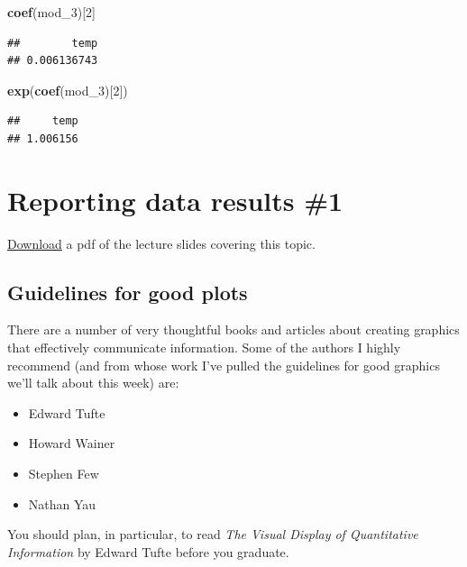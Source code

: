 \documentclass[]{book}
\makeatletter
\newenvironment{Shaded}{\begin{snugshade}}{\end{snugshade}}
\newcommand{\KeywordTok}[1]{\textcolor[rgb]{0.13,0.29,0.53}{\textbf{#1}}}
\newcommand{\DecValTok}[1]{\textcolor[rgb]{0.00,0.00,0.81}{#1}}
\newcommand{\NormalTok}[1]{#1}
\providecommand{\tightlist}{%
  \setlength{\itemsep}{0pt}\setlength{\parskip}{0pt}}
\newenvironment{kframe}{%
\medskip{}
\setlength{\fboxsep}{.8em}
 \def\at@end@of@kframe{}%
 \ifinner\ifhmode%
  \def\at@end@of@kframe{\end{minipage}}%
  \begin{minipage}{\columnwidth}%
 \fi\fi%
 \def\FrameCommand##1{\hskip\@totalleftmargin \hskip-\fboxsep
 \colorbox{shadecolor}{##1}\hskip-\fboxsep
     \hskip-\linewidth \hskip-\@totalleftmargin \hskip\columnwidth}%
 \MakeFramed {\advance\hsize-\width
   \@totalleftmargin\z@ \linewidth\hsize
   \@setminipage}}%
 {\par\unskip\endMakeFramed%
 \at@end@of@kframe}
\renewenvironment{Shaded}{\begin{kframe}}{\end{kframe}}
\theoremstyle{definition}
\theoremstyle{definition}
\theoremstyle{definition}
\theoremstyle{remark}
\makeatother
\begin{document}
\begin{Shaded}
\begin{Highlighting}[]
\KeywordTok{coef}\NormalTok{(mod_}\DecValTok{3}\NormalTok{)[}\DecValTok{2}\NormalTok{]}
\end{Highlighting}
\end{Shaded}

\begin{verbatim}
##        temp 
## 0.006136743
\end{verbatim}

\begin{Shaded}
\begin{Highlighting}[]
\KeywordTok{exp}\NormalTok{(}\KeywordTok{coef}\NormalTok{(mod_}\DecValTok{3}\NormalTok{)[}\DecValTok{2}\NormalTok{])}
\end{Highlighting}
\end{Shaded}

\begin{verbatim}
##     temp 
## 1.006156
\end{verbatim}

\chapter{Reporting data results \#1}\label{reporting-data-results-1}

\href{https://github.com/geanders/RProgrammingForResearch/raw/master/slides/CourseNotes_Week4.pdf}{Download}
a pdf of the lecture slides covering this topic.

\section{Guidelines for good plots}\label{guidelines-for-good-plots}

There are a number of very thoughtful books and articles about creating
graphics that effectively communicate information. Some of the authors I
highly recommend (and from whose work I've pulled the guidelines for
good graphics we'll talk about this week) are:

\begin{itemize}
\tightlist
\item
  Edward Tufte
\item
  Howard Wainer
\item
  Stephen Few
\item
  Nathan Yau
\end{itemize}

You should plan, in particular, to read \emph{The Visual Display of
Quantitative Information} by Edward Tufte before you graduate.
\end{document}
